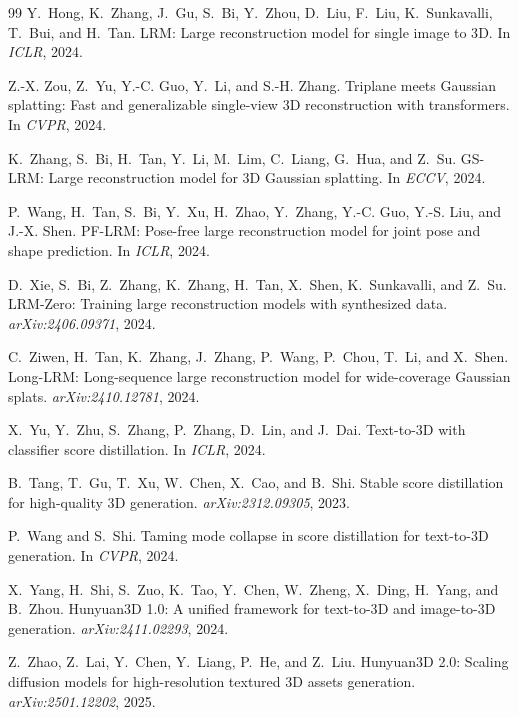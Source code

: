 \begin{thebibliography}{99}
Y.~Hong, K.~Zhang, J.~Gu, S.~Bi, Y.~Zhou, D.~Liu, F.~Liu, K.~Sunkavalli, T.~Bui, and H.~Tan.
{LRM}: Large reconstruction model for single image to 3{D}.
In \emph{ICLR}, 2024.

Z.-X. Zou, Z.~Yu, Y.-C. Guo, Y.~Li, and S.-H. Zhang.
Triplane meets Gaussian splatting: Fast and generalizable single-view 3{D} reconstruction with transformers.
In \emph{CVPR}, 2024.

K.~Zhang, S.~Bi, H.~Tan, Y.~Li, M.~Lim, C.~Liang, G.~Hua, and Z.~Su.
{GS-LRM}: Large reconstruction model for 3{D} Gaussian splatting.
In \emph{ECCV}, 2024.

P.~Wang, H.~Tan, S.~Bi, Y.~Xu, H.~Zhao, Y.~Zhang, Y.-C. Guo, Y.-S. Liu, and J.-X. Shen.
{PF-LRM}: Pose-free large reconstruction model for joint pose and shape prediction.
In \emph{ICLR}, 2024.

D.~Xie, S.~Bi, Z.~Zhang, K.~Zhang, H.~Tan, X.~Shen, K.~Sunkavalli, and Z.~Su.
{LRM-Zero}: Training large reconstruction models with synthesized data.
\emph{arXiv:2406.09371}, 2024.

C.~Ziwen, H.~Tan, K.~Zhang, J.~Zhang, P.~Wang, P.~Chou, T.~Li, and X.~Shen.
{Long-LRM}: Long-sequence large reconstruction model for wide-coverage Gaussian splats.
\emph{arXiv:2410.12781}, 2024.

X.~Yu, Y.~Zhu, S.~Zhang, P.~Zhang, D.~Lin, and J.~Dai.
Text-to-3{D} with classifier score distillation.
In \emph{ICLR}, 2024.

B.~Tang, T.~Gu, T.~Xu, W.~Chen, X.~Cao, and B.~Shi.
Stable score distillation for high-quality 3{D} generation.
\emph{arXiv:2312.09305}, 2023.

P.~Wang and S.~Shi.
Taming mode collapse in score distillation for text-to-3{D} generation.
In \emph{CVPR}, 2024.

X.~Yang, H.~Shi, S.~Zuo, K.~Tao, Y.~Chen, W.~Zheng, X.~Ding, H.~Yang, and B.~Zhou.
{Hunyuan3D} 1.0: A unified framework for text-to-3{D} and image-to-3{D} generation.
\emph{arXiv:2411.02293}, 2024.

Z.~Zhao, Z.~Lai, Y.~Chen, Y.~Liang, P.~He, and Z.~Liu.
{Hunyuan3D} 2.0: Scaling diffusion models for high-resolution textured 3{D} assets generation.
\emph{arXiv:2501.12202}, 2025.


\end{thebibliography}
